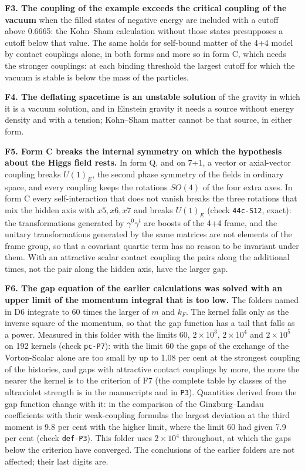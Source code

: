 \documentclass[
  10pt,
]{article}
\begin{document}
\textbf{F3. The coupling of the example exceeds the critical coupling of
the vacuum} when the filled states of negative energy are included with
a cutoff above 0.6665: the Kohn--Sham calculation without those states
presupposes a cutoff below that value. The same holds for self-bound
matter of the 4+4 model by contact couplings alone, in both forms and
more so in form C, which needs the stronger couplings: at each binding
threshold the largest cutoff for which the vacuum is stable is below the
mass of the particles.

\textbf{F4. The deflating spacetime is an unstable solution} of the
gravity in which it is a vacuum solution, and in Einstein gravity it
needs a source without energy density and with a tension; Kohn--Sham
matter cannot be that source, in either form.

\textbf{F5. Form C breaks the internal symmetry on which the hypothesis
about the Higgs field rests.} In form Q, and on 7+1, a vector or
axial-vector coupling breaks \(U(1)_E\), the second phase symmetry of
the fields in ordinary space, and every coupling keeps the rotations
\(SO(4)\) of the four extra axes. In form C every self-interaction that
does not vanish breaks the three rotations that mix the hidden axis with
\(x5,x6,x7\) and breaks \(U(1)_E\) (check \texttt{44c-S12}, exact): the
transformations generated by \(\gamma^0\gamma^t\) are boosts of the 4+4
frame, and the unitary transformations generated by the same matrices
are not elements of the frame group, so that a covariant quartic term
has no reason to be invariant under them. With an attractive scalar
contact coupling the pairs along the additional times, not the pair
along the hidden axis, have the larger gap.

\textbf{F6. The gap equation of the earlier calculations was solved with
an upper limit of the momentum integral that is too low.} The folders
named in D6 integrate to 60 times the larger of \(m\) and \(k_F\). The
kernel falls only as the inverse square of the momentum, so that the gap
function has a tail that falls as a power. Measured in this folder with
the limits 60, \(2\times10^3\), \(2\times10^4\) and \(2\times10^5\) on
192 kernels (check \texttt{pc-P7}): with the limit 60 the gaps of the
exchange of the Vorton-Scalar alone are too small by up to 1.08 per cent
at the strongest coupling of the histories, and gaps with attractive
contact couplings by more, the more the nearer the kernel is to the
criterion of F7 (the complete table by classes of the ultraviolet
strength is in the manuscripts and in \texttt{P3}). Quantities derived
from the gap function change with it: in the comparison of the
Ginzburg--Landau coefficients with their weak-coupling formulas the
largest deviation at the third moment is 9.8 per cent with the higher
limit, where the limit 60 had given 7.9 per cent (check
\texttt{def-P3}). This folder uses \(2\times10^4\) throughout, at which
the gaps below the criterion have converged. The conclusions of the
earlier folders are not affected; their last digits are.
\end{document}
